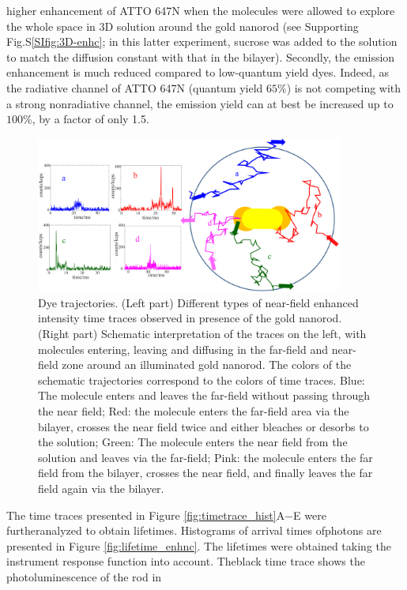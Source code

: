 \documentclass[journal=jpccck,manuscript=article]{achemso}
\begin{document}
higher enhancement of ATTO 647N when the molecules were allowed to explore the whole space in 3D solution around 
the gold nanorod (see Supporting Fig.S\ref{SIfig:3D-enhc}; in this latter experiment, sucrose was added to the 
solution to match the diffusion constant with that in the bilayer). Secondly, the emission enhancement is much 
reduced compared to low-quantum yield dyes. Indeed, as the radiative channel of ATTO 647N (quantum yield $65$\%) is 
not competing with a strong nonradiative channel, the emission yield can at best be increased up to $100$\%, by a 
factor of only 1.5.\cite{khatua2014resonant}\\
\begin{figure}
	\centering
	\includegraphics[width=0.9\textwidth]{enhnc_trajectories.png}
	\caption{Dye trajectories. (Left part) Different types of near-field enhanced intensity time traces observed 
	in presence of the gold nanorod. (Right part) Schematic interpretation of the traces on the left, with molecules 
	entering, leaving and diffusing in the far-field and near-field zone around an illuminated gold nanorod. 
	The colors of the schematic trajectories correspond to the colors of time traces. Blue: The molecule enters and 
	leaves the far-field without passing through the near field; Red: the molecule enters the far-field area via the 
	bilayer, crosses the near field twice and either bleaches or desorbs to the solution; Green: The molecule 
	enters the near field from the solution and leaves via the far-field; Pink: the molecule enters the far field 
	from the bilayer, crosses the near field, and finally leaves the far field again via the bilayer.}
	\label{fig:enhnc_trajectories}
\end{figure}
The time traces presented in Figure \ref{fig:timetrace_hist}A−E were furtheranalyzed to obtain lifetimes. 
Histograms of arrival times ofphotons are presented in Figure \ref{fig:lifetime_enhnc}. The lifetimes were obtained 
taking the instrument response function into account. Theblack time trace shows the photoluminescence of the rod in 
\end{document}
